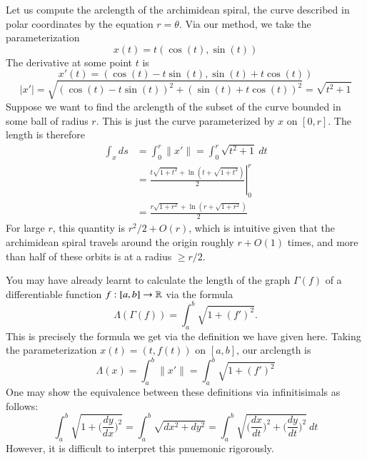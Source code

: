 \begin{example}
  Let us compute the arclength of the archimidean spiral, the curve described in polar coordinates by the equation $r = \theta$. Via our method, we take the parameterization
%
\[ x(t) = t(\cos(t), \sin(t)) \]
%
The derivative at some point $t$ is
%
\[ x'(t) = (\cos(t) - t\sin(t), \sin(t) + t\cos(t)) \]
%
\[ |x'| = \sqrt{(\cos(t) - t\sin(t))^2 + (\sin(t) + t\cos(t))^2} = \sqrt{t^2 + 1} \]
%
Suppose we want to find the arclength of the subset of the curve bounded in some ball of radius $r$. This is just the curve parameterized by $x$ on $[0,r]$. The length is therefore
%
\begin{align*}
    \int_x ds &= \int_0^r \|x'\| = \int_0^r \sqrt{t^2 + 1}\ dt\\
    &= \left. \frac{t\sqrt{1 + t^2} + \ln(t + \sqrt{1 + t^2})}{2} \right|_0^r\\
    &= \frac{r\sqrt{1 + r^2} + \ln(r + \sqrt{1 + r^2})}{2}
\end{align*}
%
For large $r$, this quantity is $r^2/2 + O(r)$, which is intuitive given that the archimidean spiral travels around the origin roughly $r + O(1)$ times, and more than half of these orbits is at a radius $\geq r/2$.
\end{example}

\begin{example}
You may have already learnt to calculate the length of the graph $\Gamma(f)$ of a differentiable function $f:[a,b] \to \operatorname{\mathbb{R}}$ via the formula
%
\[ \Lambda(\Gamma(f)) = \int_a^b \sqrt{1 + (f')^2}. \]
%
This is precisely the formula we get via the definition we have given here. Taking the parameterization $x(t) = (t,f(t))$ on $[a,b]$, our arclength is
%
\[ \Lambda(x) = \int_a^b \|x'\| = \int_a^b \sqrt{1 + (f')^2} \]
%
One may show the equivalence between these definitions via infinitisimals as follows:
%
\[ \int_a^b \sqrt{1 + \bigg(\frac{dy}{dx}\bigg)^2} = \int_a^b \sqrt{dx^2 + dy^2} = \int_a^b \sqrt{\bigg(\frac{dx}{dt}\bigg)^2 + \bigg(\frac{dy}{dt}\bigg)^2}\ dt \]
%
However, it is difficult to interpret this pnuemonic rigorously.
\end{example}

